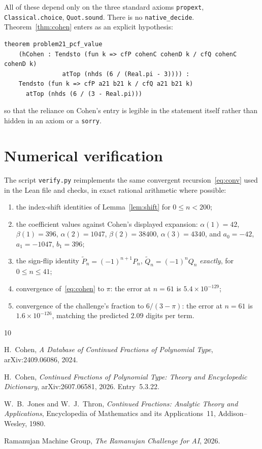 \documentclass[11pt]{article}
\theoremstyle{remark}
\begin{document}
All of these depend only on the three standard axioms \texttt{propext},
\texttt{Classical.choice}, \texttt{Quot.sound}. There is no \texttt{native\_decide}.
Theorem~\ref{thm:cohen} enters as an explicit hypothesis:
\begin{verbatim}
theorem problem21_pcf_value
    (hCohen : Tendsto (fun k => cfP cohenC cohenD k / cfQ cohenC cohenD k)
                atTop (nhds (6 / (Real.pi - 3)))) :
    Tendsto (fun k => cfP a21 b21 k / cfQ a21 b21 k)
      atTop (nhds (6 / (3 - Real.pi)))
\end{verbatim}
so that the reliance on Cohen's entry is legible in the statement itself rather
than hidden in an axiom or a \texttt{sorry}.

\section{Numerical verification}\label{sec:numeric}

The script \texttt{verify.py} reimplements the same convergent
recursion~\eqref{eq:conv} used in the Lean file and checks, in exact rational
arithmetic where possible:

\begin{enumerate}
\item the index-shift identities of Lemma~\ref{lem:shift} for $0 \le n < 200$;
\item the coefficient values against Cohen's displayed expansion:
$\alpha(1)=42$, $\beta(1)=396$, $\alpha(2)=1047$, $\beta(2)=38400$,
$\alpha(3)=4340$, and $a_0=-42$, $a_1=-1047$, $b_1=396$;
\item the sign-flip identity $\widetilde P_n = (-1)^{n+1}P_n$,
$\widetilde Q_n = (-1)^{n}Q_n$ \emph{exactly}, for $0 \le n \le 41$;
\item convergence of~\eqref{eq:cohen} to $\pi$: the error at $n=61$ is
$5.4\times10^{-129}$;
\item convergence of the challenge's fraction to $6/(3-\pi)$: the error at
$n=61$ is $1.6\times10^{-126}$, matching the predicted $2.09$ digits per term.
\end{enumerate}

\begin{thebibliography}{10}

H.~Cohen,
\emph{A Database of Continued Fractions of Polynomial Type},
arXiv:2409.06086, 2024.

H.~Cohen,
\emph{Continued Fractions of Polynomial Type: Theory and Encyclopedic
Dictionary}, arXiv:2607.06581, 2026. Entry~5.3.22.

W.~B.~Jones and W.~J.~Thron,
\emph{Continued Fractions: Analytic Theory and Applications},
Encyclopedia of Mathematics and its Applications~11, Addison--Wesley, 1980.

Ramanujan Machine Group,
\emph{The Ramanujan Challenge for AI}, 2026.

\end{thebibliography}
\end{document}
